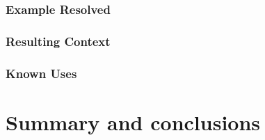 \subsubsection{Example Resolved}
\subsubsection{Resulting Context}
\subsubsection{Known Uses}





\section{Summary and conclusions}
